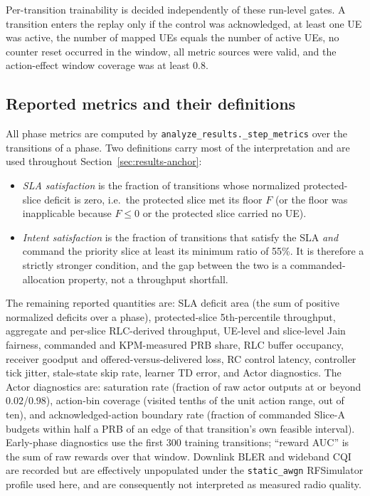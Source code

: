 Per-transition trainability is decided independently of these run-level gates. A transition
enters the replay only if the control was acknowledged, at least one UE was active, the number
of mapped UEs equals the number of active UEs, no counter reset occurred in the window, all
metric sources were valid, and the action-effect window coverage was at least 0.8.

\subsection{Reported metrics and their definitions}
All phase metrics are computed by \texttt{analyze\_results.\_step\_metrics} over the
transitions of a phase. Two definitions carry most of the interpretation and are used
throughout Section~\ref{sec:results-anchor}:

\begin{itemize}
  \item \emph{SLA satisfaction} is the fraction of transitions whose normalized protected-slice
  deficit is zero, i.e.\ the protected slice met its floor $F$ (or the floor was inapplicable
  because $F\le0$ or the protected slice carried no UE).
  \item \emph{Intent satisfaction} is the fraction of transitions that satisfy the SLA
  \emph{and} command the priority slice at least its minimum ratio of 55\%. It is therefore a
  strictly stronger condition, and the gap between the two is a commanded-allocation property,
  not a throughput shortfall.
\end{itemize}

The remaining reported quantities are: SLA deficit area (the sum of positive normalized
deficits over a phase), protected-slice 5th-percentile throughput, aggregate and per-slice
RLC-derived throughput, UE-level and slice-level Jain fairness, commanded and KPM-measured PRB
share, RLC buffer occupancy, receiver goodput and offered-versus-delivered loss, RC control
latency, controller tick jitter, stale-state skip rate, learner TD error, and Actor
diagnostics. The Actor diagnostics are: saturation rate (fraction of raw actor outputs at or
beyond $0.02$/$0.98$), action-bin coverage (visited tenths of the unit action range, out of
ten), and acknowledged-action boundary rate (fraction of commanded Slice-A budgets within half
a PRB of an edge of that transition's own feasible interval). Early-phase diagnostics use the
first 300 training transitions; ``reward AUC'' is the sum of raw rewards over that window.
Downlink BLER and wideband CQI are recorded but are effectively unpopulated under the
\texttt{static\_awgn} RFSimulator profile used here, and are consequently not interpreted as
measured radio quality.


